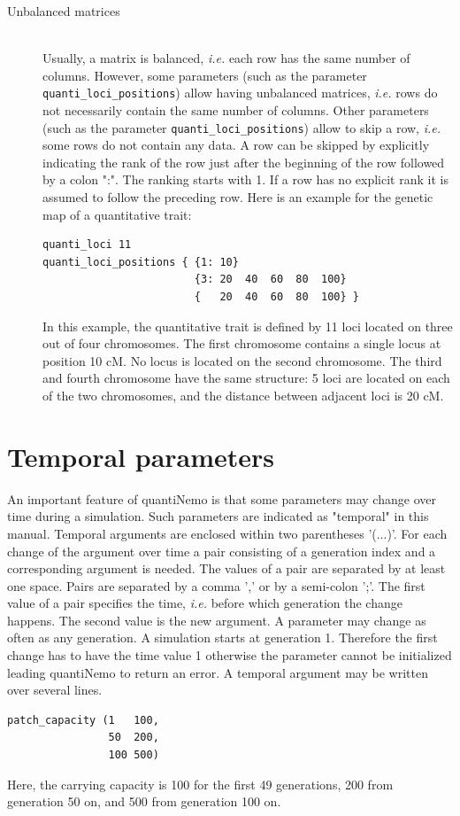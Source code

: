 \documentclass[letterpaper,12pt,oneside]{book}
\begin{document}
\begin{description}
\begin{description}
\item[Unbalanced matrices]\hspace*{\fill}\\
Usually, a matrix is balanced, \textit{i.e.} each row has the same number of columns. However, some parameters (such as the parameter \texttt{quanti\_loci\_positions}) allow having unbalanced matrices, \textit{i.e.} rows do not necessarily contain the same number of columns. Other parameters (such as the parameter \texttt{quanti\_loci\_positions}) allow to skip a row, \textit{i.e.} some rows do not contain any data. A row can be skipped by explicitly indicating the rank of the row just after the beginning of the row followed by a colon ":". The ranking starts with 1. If a row has no explicit rank it is assumed to follow the preceding row. Here is an example for the genetic map of a quantitative trait:
\begin{lstlisting}[frame=single]
quanti_loci 11
quanti_loci_positions { {1: 10}
                        {3: 20  40  60  80  100}
                        {   20  40  60  80  100} }
\end{lstlisting} 
In this example, the quantitative trait is defined by 11 loci located on three out of four chromosomes. The first chromosome contains a single locus at position 10 cM. No locus is located on the second chromosome. The third and fourth chromosome have the same structure: 5 loci are located on each of the two chromosomes, and the distance between adjacent loci is 20 cM.
\end{description}
\end{description}

\section{Temporal parameters}\label{tempParam}
An important feature of quantiNemo is that some parameters may change over time during a simulation. Such parameters are indicated as "temporal" in this manual. Temporal arguments are enclosed within two parentheses '(...)'. For each change of the argument over time a pair consisting of a generation index and a corresponding argument is needed. The values of a pair are separated by at least one space. Pairs are separated by a comma ',' or by a semi-colon ';'. The first value of a pair specifies the time, \textit{i.e.} before which generation the change happens. The second value is the new argument. A parameter may change as often as any generation. A simulation starts at generation 1. Therefore the first change has to have the time value 1 otherwise the parameter cannot be initialized leading quantiNemo to return an error. A temporal argument may be written over several lines.
\begin{lstlisting}[frame=single]
patch_capacity (1   100, 
                50  200, 
                100 500)
\end{lstlisting}
Here, the carrying capacity is 100 for the first 49 generations, 200 from generation 50 on, and 500 from generation 100 on. 
\end{document}

